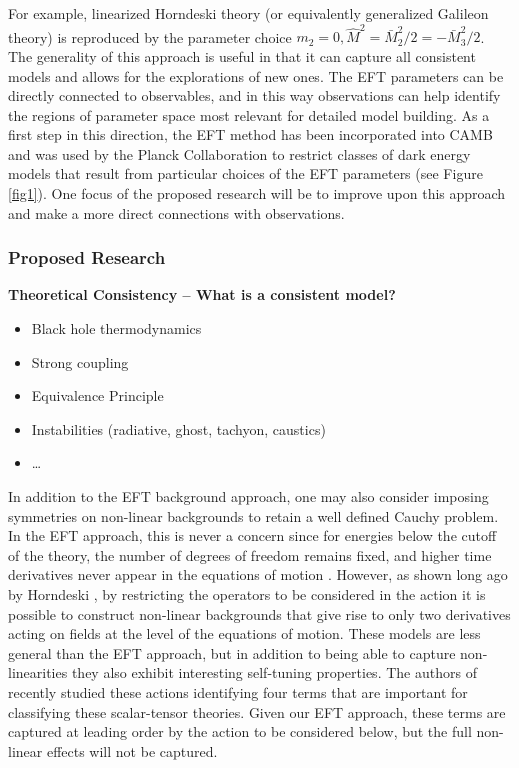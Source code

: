 \documentclass[useAMS,12pt]{article}
\begin{document}
 For example, linearized Horndeski theory (or equivalently generalized Galileon theory) 
is reproduced by the parameter choice $m_2=0, \hat{M}^2=\bar{M}_2^2/2=-\bar{M}_3^2/2$. 
The generality of this approach is useful in that it can capture all consistent models and allows for the explorations
of new ones.  The EFT parameters can be directly connected to observables, and in this way observations can help identify 
the regions of parameter space most relevant for detailed model building. As a first step in this direction, the EFT method has been incorporated into
CAMB \cite{silvestri} and was used by the Planck Collaboration to restrict classes of dark energy models that result from particular choices of the EFT parameters (see Figure \ref{fig1}). 
One focus of the proposed research will be to improve upon this approach and make a more direct connections with observations.



\subsubsection{Proposed Research}
{\bf Theoretical Consistency -- What is a consistent model?}
\begin{itemize}
\item Black hole thermodynamics
\item Strong coupling
\item Equivalence Principle
\item Instabilities (radiative, ghost, tachyon, caustics)
\item \ldots
\end{itemize}
 In addition to the EFT background approach, one may also consider imposing symmetries on non-linear backgrounds to retain a well defined Cauchy problem.  In the EFT approach, this is never a concern since for energies below the cutoff of the theory, the number of degrees of freedom remains fixed, and higher time derivatives never appear in the equations of motion \cite{Weinberg:2008hq}.  However, as shown long ago by Horndeski \cite{1974IJTP...10..363H}, by restricting the operators to be considered in the action it is possible to construct non-linear backgrounds that give rise to only two derivatives acting on fields at the level of the equations of motion.  These models are less general than the EFT approach, but in addition to being able to capture non-linearities they also exhibit interesting self-tuning properties.  The authors of \cite{Charmousis:2011bf} recently studied these actions identifying four terms that are important for classifying these scalar-tensor theories.  Given our EFT approach, these terms are captured at leading order by the action to be considered below, but the full non-linear effects will not be captured.  
\\
\end{document}
